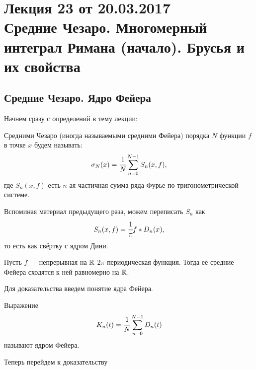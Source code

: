 \pagestyle{fancy}
\section{Лекция 23 от 20.03.2017 \\ Средние Чезаро. Многомерный интеграл Римана (начало). Брусья и их свойства}
	\subsection{Средние Чезаро. Ядро Фейера}
	Начнем сразу с определений в тему лекции:
	\begin{Def}
		Средними Чезаро (иногда называемыми средними Фейера) порядка $N$ функции $f$ в точке $x$ будем называть:
		$$
			\sigma_N(x) = \cfrac{1}{N} \sum\limits_{n =0}^{N -1}S_n(x,f),
		$$
		 где $S_n(x,f)$ есть $n$-ая частичная сумма ряда Фурье по тригонометрической системе.
	\end{Def}
	Вспоминая материал предыдущего раза, можем переписать $S_n$ как
	$$
		S_n(x,f) = \cfrac{1}{\pi} f*D_n(x),
	$$
	 то есть как свёртку с ядром Дини.
	\begin{Theorem}
		Пусть $f$ --- непрерывная на $\mathbb{R}$ $2\pi$-периодическая функция. Тогда её средние Фейера сходятся к ней равномерно на $\mathbb{R}$. 
	\end{Theorem}
	Для доказательства введем понятие ядра Фейера.
	\begin{Def}
		Выражение
		$$
			K_n(t) = \cfrac{1}{N}\sum\limits_{n=0}^{N-1}D_n(t)
		$$
		называют ядром Фейера.
	\end{Def}
	Теперь перейдем к доказательству
